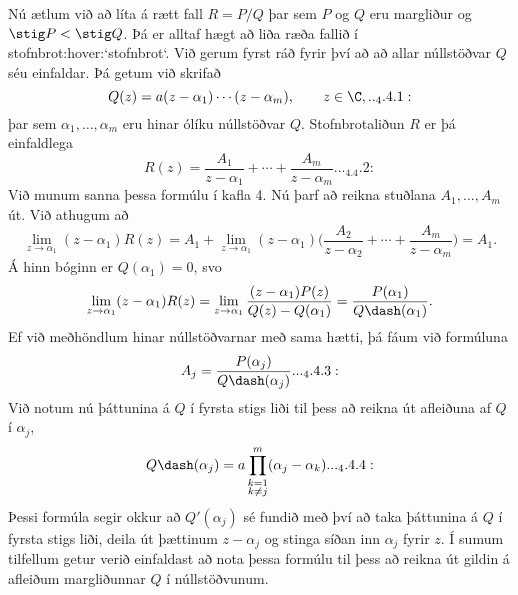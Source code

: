 Nú ætlum við að líta á rætt fall  $R=P/Q$ þar sem  $P$ og $Q$ 
eru margliður og $\stig P < \stig Q$.  Þá er 
alltaf hægt að liða ræða fallið
í stofnbrot:hover:`stofnbrot`.  Við gerum fyrst ráð fyrir því að
að allar núllstöðvar $Q$ séu einfaldar.  Þá getum við
skrifað
 \begin{equation*}Q(z)= a(z-\alpha_1)\cdots(z-\alpha_m), \qquad z\in \C,


.. _4.4.1:

 \end{equation*}
þar sem $\alpha_1,\dots,\alpha_m$ eru hinar ólíku núllstöðvar $Q$.
Stofnbrotaliðun $R$ er þá einfaldlega
 \begin{equation*}R(z) = \dfrac {A_1}{z-\alpha_1}+\cdots+\dfrac {A_m}{z-\alpha_m}.


.. _4.4.2:

 \end{equation*}
Við munum sanna þessa formúlu í kafla 4.
Nú þarf að reikna stuðlana $A_1,\dots,A_m$ út.  Við athugum að
 $$\lim\limits_{z\to\alpha_1} (z-\alpha_1)R(z) = A_1
+\lim\limits_{z\to\alpha_1}
(z-{\alpha}_1)\bigg(
\dfrac {A_2}{z-\alpha_2}+\cdots+\dfrac {A_m}{z-\alpha_m}
\bigg)=A_1.
 $$
{Á} hinn bóginn er $Q(\alpha_1)=0$, svo
 $$\lim\limits_{z\to\alpha_1}(z-\alpha_1)R(z) =
\lim\limits_{z\to
\alpha_1}\dfrac{(z-\alpha_1)P(z)}{Q(z)-Q(\alpha_1)}=
\dfrac{P(\alpha_1)}{Q\dash(\alpha_1)}.
 $$
Ef við meðhöndlum hinar núllstöðvarnar með sama hætti, þá fáum við
formúluna
 \begin{equation*}A_j=\dfrac{P(\alpha_j)}{Q\dash(\alpha_j)}.


.. _4.4.3:

 \end{equation*}
Við notum nú þáttunina á $Q$ í fyrsta stigs liði til þess að 
reikna út afleiðuna af $Q$ í ${\alpha}_j$,
 \begin{equation*}Q\dash(\alpha_j)=a\prod_{\substack{k=1\\ k\neq
 j}}^m
(\alpha_j-\alpha_k).


.. _4.4.4:

 \end{equation*}
Þessi formúla segir okkur að $Q'(\alpha_j)$ sé fundið með því að
taka þáttunina á $Q$ í fyrsta stigs liði, deila út þættinum
$z-\alpha_j$ og stinga síðan inn $\alpha_j$ fyrir $z$.
Í sumum tilfellum getur verið einfaldast að nota þessa formúlu til
þess að reikna út gildin á afleiðum margliðunnar $Q$ í núllstöðvunum.


